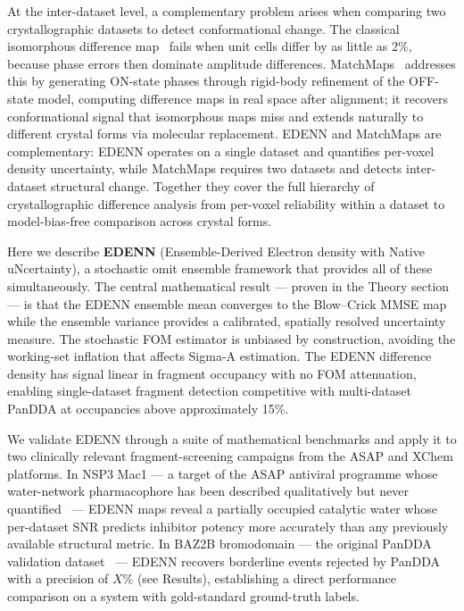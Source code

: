 \documentclass[10pt,twocolumn]{article}
\begin{document}
At the inter-dataset level, a complementary problem arises when
comparing two crystallographic datasets to detect conformational
change.
The classical isomorphous difference map~\cite{rould2003} fails
when unit cells differ by as little as 2\%, because phase errors
then dominate amplitude differences.
MatchMaps~\cite{brookner2023} addresses this by generating
ON-state phases through rigid-body refinement of the OFF-state
model, computing difference maps in real space after alignment;
it recovers conformational signal that isomorphous maps miss and
extends naturally to different crystal forms via molecular replacement.
EDENN and MatchMaps are complementary: EDENN operates on a single
dataset and quantifies per-voxel density uncertainty, while MatchMaps
requires two datasets and detects inter-dataset structural change.
Together they cover the full hierarchy of crystallographic difference
analysis from per-voxel reliability within a dataset to
model-bias-free comparison across crystal forms.

Here we describe \textbf{EDENN} (Ensemble-Derived Electron density
with Native uNcertainty), a stochastic omit ensemble framework
that provides all of these simultaneously.
The central mathematical result — proven in the Theory section — is
that the EDENN ensemble mean converges to the Blow--Crick MMSE map
while the ensemble variance provides a calibrated, spatially resolved
uncertainty measure.  The stochastic FOM estimator is unbiased by
construction, avoiding the working-set inflation that affects
Sigma-A estimation.  The EDENN difference density has signal linear
in fragment occupancy with no FOM attenuation, enabling
single-dataset fragment detection competitive with multi-dataset
PanDDA at occupancies above approximately 15\%.

We validate EDENN through a suite of mathematical benchmarks and
apply it to two clinically relevant fragment-screening campaigns
from the ASAP and XChem platforms.  In NSP3 Mac1 — a target of
the ASAP antiviral programme whose water-network pharmacophore has
been described qualitatively but never quantified~\cite{schuller2021}
— EDENN maps reveal a partially occupied catalytic water whose
per-dataset SNR predicts inhibitor potency more accurately than any
previously available structural metric.  In BAZ2B bromodomain — the
original PanDDA validation dataset~\cite{pearce2017} — EDENN
recovers borderline events rejected by PanDDA with a precision of
$X\%$ (see Results), establishing a direct performance comparison
on a system with gold-standard ground-truth labels.
\end{document}
